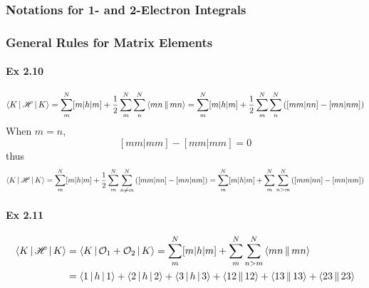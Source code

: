 \documentclass[a4paper]{article}
\newcommand{\ex}[1]{\paragraph{Ex #1}}
\numberwithin{equation}{subsection}
\begin{document}
\subsubsection{Notations for 1- and 2-Electron Integrals}
\subsubsection{General Rules for Matrix Elements}
\ex{2.10}
\begin{equation}\label{key}
\Braket{K | \mathscr{H} | K} = \sum_m^N [m|h|m] + \dfrac{1}{2}\sum_m^N\sum_n^N \Braket{mn||mn} = \sum_m^N [m|h|m] + \dfrac{1}{2}\sum_m^N\sum_n^N \qty([mm|nn] - [mn|nm])
\end{equation}
When $ m=n $,
\begin{equation}\label{key}
[mm|mm] - [mm|mm] = 0
\end{equation}
thus
\begin{equation}\label{key}
\Braket{K | \mathscr{H} | K} = \sum_m^N [m|h|m] + \dfrac{1}{2}\sum_m^N\sum_{n\neq m}^N \qty([mm|nn] - [mn|nm]) = \sum_m^N [m|h|m] + \sum_m^N\sum_{n> m}^N \qty([mm|nn] - [mn|nm])
\end{equation}
\ex{2.11}
\begin{equation}\label{key}
\begin{aligned}
\Braket{K | \mathscr{H} | K} &= \Braket{K | \mathcal{O}_1 + \mathcal{O}_2 | K} = \sum_m^N [m|h|m] + \sum_m^N\sum_{n>m}^N \Braket{mn||mn}\\
&= \Braket{1|h|1} + \Braket{2|h|2} + \Braket{3|h|3} + \Braket{12||12} + \Braket{13||13} + \Braket{23||23} 
\end{aligned}
\end{equation}
\end{document}
